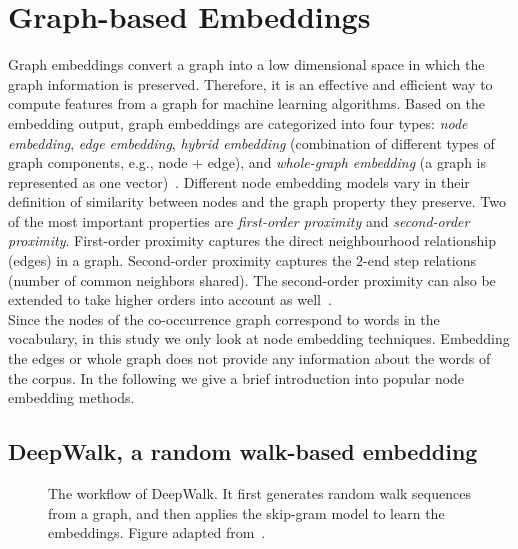 \section{Graph-based Embeddings}
\label{sec:graph}
Graph embeddings convert a graph into a low dimensional space in which the graph information is preserved. Therefore, it is an effective and efficient way to compute features from a graph for machine learning algorithms. Based on the embedding output, graph embeddings are categorized into four types: \emph{node embedding}, \emph{edge embedding}, \emph{hybrid embedding} (combination of different types of graph components, e.g., node $+$ edge), and  \emph{whole-graph embedding} (a graph is represented as one vector)~. Different node embedding models vary in their definition of similarity between nodes and the graph property they preserve. Two of the most important properties are \emph{first-order proximity} and \emph{second-order proximity}. First-order proximity captures the direct neighbourhood relationship (edges) in a graph. Second-order proximity captures the $2$-end step relations (number of common neighbors shared). The second-order proximity can also be extended to take higher orders into account as well~.\\
Since the nodes of the co-occurrence graph correspond to words in the vocabulary, in this study we only look at node embedding techniques. Embedding the edges or whole graph does not provide any information about the words of the corpus. In the following we give a brief introduction into popular node embedding methods. 
\subsection{DeepWalk, a random walk-based embedding}
\label{subsec:DeepWalk}
\begin{figure}
\centering 
\resizebox{0.8\textwidth}{0.35\textwidth}{      

}
\caption{The workflow of DeepWalk. It first generates random walk sequences from a graph, and then applies the skip-gram model to learn the embeddings. Figure adapted from~.}
\label{fig:deepwalk}
\end{figure}

